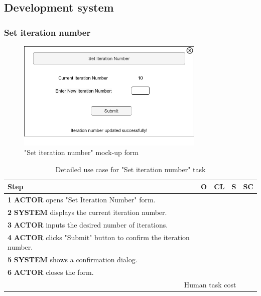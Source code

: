 \subsection{Development system}

\subsubsection{Set iteration number}

\begin{figure}[H]
\centering
\includegraphics[width=0.8\textwidth]{figures/set_iteration_number.png}
\caption{"Set iteration number" mock-up form}
\end{figure}

\begin{table}[H]
\centering
\begin{tabularx}{\textwidth}{|X|c|c|c|c|}
\hline
\textbf{Step} & \textbf{O} & \textbf{CL} & \textbf{S} & \textbf{SC} \\
\hline
\textbf{1} \textbf{ACTOR} opens "Set Iteration Number" form. & & & & \\
\hline
\textbf{2} \textbf{SYSTEM} displays the current iteration number. & & & & \\
\hline
\textbf{3} \textbf{ACTOR} inputs the desired number of iterations. & & & & \\
\hline
\textbf{4} \textbf{ACTOR} clicks "Submit" button to confirm the iteration number. & & & & \\
\hline
\textbf{5} \textbf{SYSTEM} shows a confirmation dialog. & & & & \\
\hline
\textbf{6} \textbf{ACTOR} closes the form. & & & & \\
\hline
\multicolumn{4}{|r|}{Human task cost} & \\
\hline
\end{tabularx}
\caption{Detailed use case for "Set iteration number" task}
\label{table:set_iteration_number}
\end{table}

